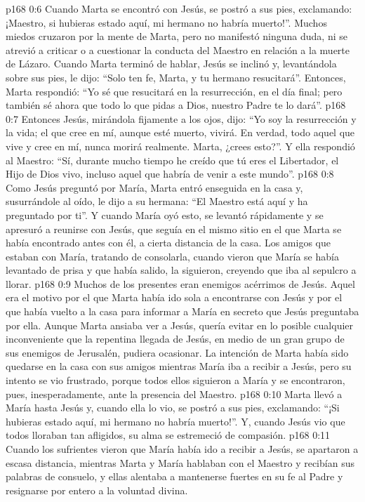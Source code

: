 \vs p168 0:6 Cuando Marta se encontró con Jesús, se postró a sus pies, exclamando: ¡Maestro, si hubieras estado aquí, mi hermano no habría muerto!”. Muchos miedos cruzaron por la mente de Marta, pero no manifestó ninguna duda, ni se atrevió a criticar o a cuestionar la conducta del Maestro en relación a la muerte de Lázaro. Cuando Marta terminó de hablar, Jesús se inclinó y, levantándola sobre sus pies, le dijo: “Solo ten fe, Marta, y tu hermano resucitará”. Entonces, Marta respondió: “Yo sé que resucitará en la resurrección, en el día final; pero también sé ahora que todo lo que pidas a Dios, nuestro Padre te lo dará”.
\vs p168 0:7 Entonces Jesús, mirándola fijamente a los ojos, dijo: “Yo soy la resurrección y la vida; el que cree en mí, aunque esté muerto, vivirá. En verdad, todo aquel que vive y cree en mí, nunca morirá realmente. Marta, ¿crees esto?”. Y ella respondió al Maestro: “Sí, durante mucho tiempo he creído que tú eres el Libertador, el Hijo de Dios vivo, incluso aquel que habría de venir a este mundo”.
\vs p168 0:8 Como Jesús preguntó por María, Marta entró enseguida en la casa y, susurrándole al oído, le dijo a su hermana: “El Maestro está aquí y ha preguntado por ti”. Y cuando María oyó esto, se levantó rápidamente y se apresuró a reunirse con Jesús, que seguía en el mismo sitio en el que Marta se había encontrado antes con él, a cierta distancia de la casa. Los amigos que estaban con María, tratando de consolarla, cuando vieron que María se había levantado de prisa y que había salido, la siguieron, creyendo que iba al sepulcro a llorar.
\vs p168 0:9 Muchos de los presentes eran enemigos acérrimos de Jesús. Aquel era el motivo por el que Marta había ido sola a encontrarse con Jesús y por el que había vuelto a la casa para informar a María en secreto que Jesús preguntaba por ella. Aunque Marta ansiaba ver a Jesús, quería evitar en lo posible cualquier inconveniente que la repentina llegada de Jesús, en medio de un gran grupo de sus enemigos de Jerusalén, pudiera ocasionar. La intención de Marta había sido quedarse en la casa con sus amigos mientras María iba a recibir a Jesús, pero su intento se vio frustrado, porque todos ellos siguieron a María y se encontraron, pues, inesperadamente, ante la presencia del Maestro.
\vs p168 0:10 Marta llevó a María hasta Jesús y, cuando ella lo vio, se postró a sus pies, exclamando: “¡Si hubieras estado aquí, mi hermano no habría muerto!”. Y, cuando Jesús vio que todos lloraban tan afligidos, su alma se estremeció de compasión.
\vs p168 0:11 Cuando los sufrientes vieron que María había ido a recibir a Jesús, se apartaron a escasa distancia, mientras Marta y María hablaban con el Maestro y recibían sus palabras de consuelo, y ellas alentaba a mantenerse fuertes en su fe al Padre y resignarse por entero a la voluntad divina.
